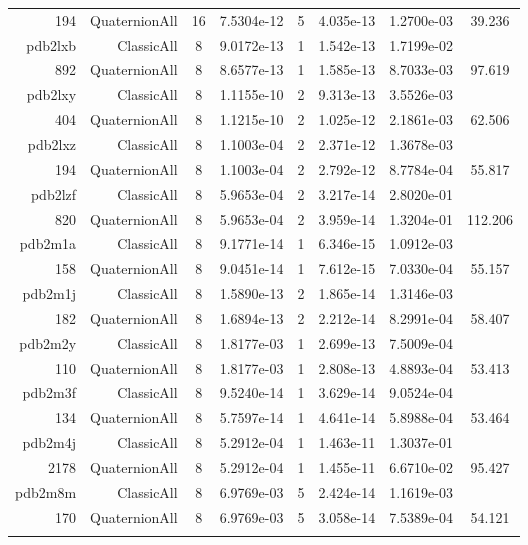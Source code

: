 \begin{xltabular}{\textwidth}{r|rcS[table-format=1.4e+2]cS[table-format=1.3e+2]S[table-format=1.4e+2]S[table-format=-1.3]}
194 & QuaternionAll & 16 & 7.5304e-12 & 5 & 4.035e-13 & 1.2700e-03 & 39.236\\  \addlinespace
pdb2lxb & ClassicAll & 8 & 9.0172e-13 & 1 & 1.542e-13 & 1.7199e-02 & \\
892 & QuaternionAll & 8 & 8.6577e-13 & 1 & 1.585e-13 & 8.7033e-03 & 97.619\\  \addlinespace
pdb2lxy & ClassicAll & 8 & 1.1155e-10 & 2 & 9.313e-13 & 3.5526e-03 & \\
404 & QuaternionAll & 8 & 1.1215e-10 & 2 & 1.025e-12 & 2.1861e-03 & 62.506\\  \addlinespace
pdb2lxz & ClassicAll & 8 & 1.1003e-04 & 2 & 2.371e-12 & 1.3678e-03 & \\
194 & QuaternionAll & 8 & 1.1003e-04 & 2 & 2.792e-12 & 8.7784e-04 & 55.817\\  \addlinespace
pdb2lzf & ClassicAll & 8 & 5.9653e-04 & 2 & 3.217e-14 & 2.8020e-01 & \\
820 & QuaternionAll & 8 & 5.9653e-04 & 2 & 3.959e-14 & 1.3204e-01 & 112.206\\  \addlinespace
pdb2m1a & ClassicAll & 8 & 9.1771e-14 & 1 & 6.346e-15 & 1.0912e-03 & \\
158 & QuaternionAll & 8 & 9.0451e-14 & 1 & 7.612e-15 & 7.0330e-04 & 55.157\\  \addlinespace
pdb2m1j & ClassicAll & 8 & 1.5890e-13 & 2 & 1.865e-14 & 1.3146e-03 & \\
182 & QuaternionAll & 8 & 1.6894e-13 & 2 & 2.212e-14 & 8.2991e-04 & 58.407\\  \addlinespace
pdb2m2y & ClassicAll & 8 & 1.8177e-03 & 1 & 2.699e-13 & 7.5009e-04 & \\
110 & QuaternionAll & 8 & 1.8177e-03 & 1 & 2.808e-13 & 4.8893e-04 & 53.413\\  \addlinespace
pdb2m3f & ClassicAll & 8 & 9.5240e-14 & 1 & 3.629e-14 & 9.0524e-04 & \\
134 & QuaternionAll & 8 & 5.7597e-14 & 1 & 4.641e-14 & 5.8988e-04 & 53.464\\  \addlinespace
pdb2m4j & ClassicAll & 8 & 5.2912e-04 & 1 & 1.463e-11 & 1.3037e-01 & \\
2178 & QuaternionAll & 8 & 5.2912e-04 & 1 & 1.455e-11 & 6.6710e-02 & 95.427\\  \addlinespace
pdb2m8m & ClassicAll & 8 & 6.9769e-03 & 5 & 2.424e-14 & 1.1619e-03 & \\
170 & QuaternionAll & 8 & 6.9769e-03 & 5 & 3.058e-14 & 7.5389e-04 & 54.121\\  \addlinespace

\end{xltabular}
